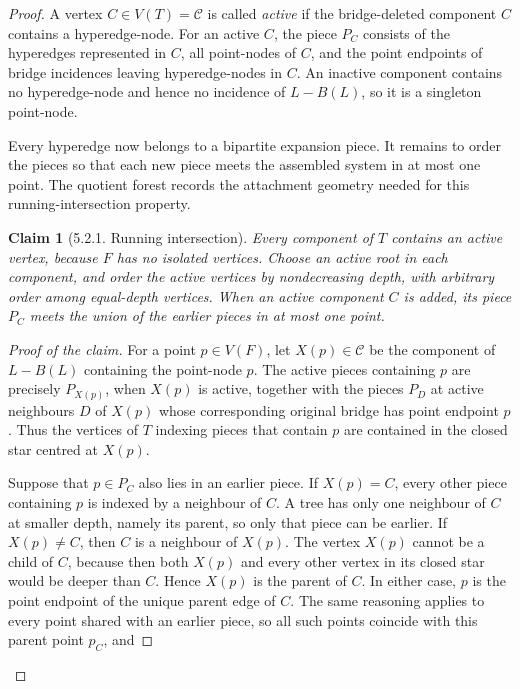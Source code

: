 \documentclass[a4paper,11pt,reqno]{amsart}
\theoremstyle{plain}
\newtheorem*{claim}{Claim}
\theoremstyle{definition}
\theoremstyle{remark}
\begin{document}
\begin{proof}
A vertex \(C\in V(T)=\mathscr C\) is called \emph{active} if the bridge-deleted component \(C\) contains a hyperedge-node. For an active \(C\), the piece \(P_C\) consists of the hyperedges represented in \(C\), all point-nodes of \(C\), and the point endpoints of bridge incidences leaving hyperedge-nodes in \(C\). An inactive component contains no hyperedge-node and hence no incidence of \(L-B(L)\), so it is a singleton point-node.

Every hyperedge now belongs to a bipartite expansion piece.  It remains to
order the pieces so that each new piece meets the assembled system in at most
one point.  The quotient forest records the attachment geometry needed for
this running-intersection property.

\begin{claim}[5.2.1. Running intersection]

Every component of \(T\) contains an active vertex, because \(F\) has no isolated vertices. Choose an active root in each component, and order the active vertices by nondecreasing depth, with arbitrary order among equal-depth vertices. When an active component \(C\) is added, its piece \(P_C\) meets the union of the earlier pieces in at most one point.

\end{claim}
\begin{proof}[Proof of the claim]
For a point \(p\in V(F)\), let \(X(p)\in\mathscr C\) be the component of \(L-B(L)\) containing the point-node \(p\). The active pieces containing \(p\) are precisely \(P_{X(p)}\), when \(X(p)\) is active, together with the pieces \(P_D\) at active neighbours \(D\) of \(X(p)\) whose corresponding original bridge has point endpoint \(p\). Thus the vertices of \(T\) indexing pieces that contain \(p\) are contained in the closed star centred at \(X(p)\).

Suppose that \(p\in P_C\) also lies in an earlier piece. If \(X(p)=C\),
every other piece containing \(p\) is indexed by a neighbour of \(C\). A tree
has only one neighbour of \(C\) at smaller depth, namely its parent, so only
that piece can be earlier. If \(X(p)\ne C\), then \(C\) is a neighbour of
\(X(p)\). The vertex \(X(p)\) cannot be a child of \(C\), because then both
\(X(p)\) and every other vertex in its closed star would be deeper than
\(C\). Hence \(X(p)\) is the parent of \(C\). In either case, \(p\) is the
point endpoint of the unique parent edge of \(C\). The same reasoning applies
to every point shared with an earlier piece, so all such points coincide with
this parent point \(p_C\), and


\end{proof}
\end{proof}
\end{document}
